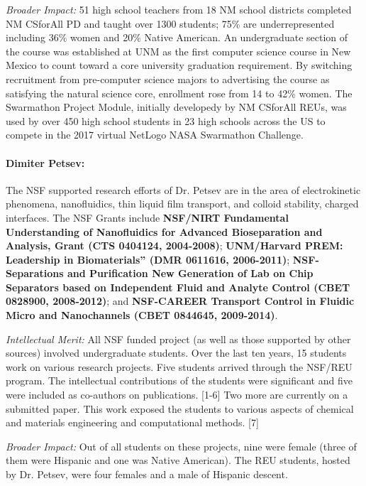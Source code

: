 \noindent \textit{Broader Impact:}
51 high school teachers from 18 NM school districts completed NM CSforAll PD and taught over 1300 students; 75\% are underrepresented including 36\% women and 20\% Native American. An undergraduate section of the course was established at UNM as the first computer science course in New Mexico to count toward a core university graduation requirement. By switching recruitment from pre-computer science majors to advertising the course as satisfying the natural science core, enrollment rose from 14 to 42\% women. 
The Swarmathon Project Module, initially developedy by NM CSforAll REUs, was used by over 450 high school students in 23 high schools across the US to compete in the 2017 virtual NetLogo NASA Swarmathon Challenge. 

\paragraph{Dimiter Petsev:}
The NSF supported research efforts of Dr. Petsev are in the area of electrokinetic phenomena, nanofluidics, thin liquid film transport, and colloid stability, charged interfaces. The NSF Grants include \textbf{NSF/NIRT Fundamental Understanding of Nanofluidics for Advanced Bioseparation and Analysis, Grant (CTS 0404124, 2004-2008)}; \textbf{UNM/Harvard PREM: Leadership in Biomaterials” (DMR 0611616, 2006-2011)}; \textbf{NSF-Separations and Purification New Generation of Lab on Chip Separators based on Independent Fluid and Analyte Control (CBET 0828900, 2008-2012)}; and \textbf{NSF-CAREER Transport Control in Fluidic Micro and Nanochannels (CBET 0844645, 2009-2014)}.

\noindent\textit{Intellectual Merit:} All NSF funded project (as well as those supported by other sources) involved undergraduate students. Over the last ten years, 15 students work on various research projects. Five students arrived through the NSF/REU program. The intellectual contributions of the students were significant and five were included as co-authors on publications. [1-6] Two more are currently on a submitted paper. This work exposed the students to various aspects of chemical and materials engineering and computational methods. [7]

\noindent\textit{Broader Impact:} Out of all students on these projects, nine were female (three of them were Hispanic and one was Native American). The REU students, hosted by Dr. Petsev, were four females and a male of Hispanic descent.    

